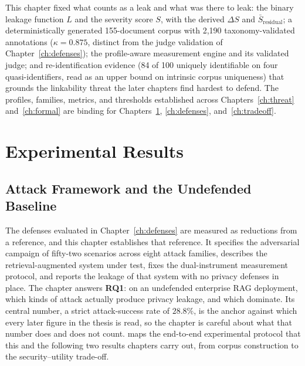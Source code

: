 \documentclass[12pt,a4paper]{report}
\begin{document}
This chapter fixed what counts as a leak and what was there to leak: the binary leakage function
$L$ and the severity score $S$, with the derived $\Delta S$ and $\bar{S}_{\text{residual}}$; a
deterministically generated 155-document corpus with 2{,}190 taxonomy-validated annotations
($\kappa = 0.875$, distinct from the judge validation of Chapter~\ref{ch:defenses}); the
profile-aware measurement engine and its validated judge; and re-identification evidence (84
of 100 uniquely identifiable on four quasi-identifiers, read as an upper bound on intrinsic
corpus uniqueness) that grounds the linkability threat the later chapters find hardest to
defend. The profiles, families, metrics, and thresholds established across
Chapters~\ref{ch:threat} and~\ref{ch:formal} are binding for Chapters~\ref{ch:baseline},
\ref{ch:defenses}, and~\ref{ch:tradeoff}.


\part{Experimental Results}

\chapter{Attack Framework and the Undefended Baseline}
\label{ch:baseline}

The defenses evaluated in Chapter~\ref{ch:defenses} are measured as reductions from a reference,
and this chapter establishes that reference. It specifies the adversarial campaign of fifty-two
scenarios across eight attack families, describes the retrieval-augmented system under test, fixes
the dual-instrument measurement protocol, and reports the leakage of that system with no privacy
defenses in place. The chapter answers \textbf{RQ1}: on an undefended enterprise RAG deployment,
which kinds of attack actually produce privacy leakage, and which dominate. Its central number, a
strict attack-success rate of $28.8\%$, is the anchor against which every later figure in the
thesis is read, so the chapter is careful about what that number does and does not count.
 maps the end-to-end experimental protocol that this and the following two
results chapters carry out, from corpus construction to the security--utility trade-off.
\end{document}
